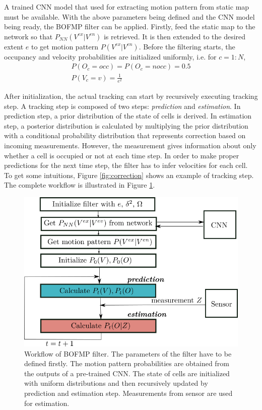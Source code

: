 A trained CNN model that used for extracting motion pattern from static map must be available. With the above parameters being defined and the CNN model being ready, the BOFMP filter can be applied. Firstly, feed the static map to the network so that $P_{NN}(V^{ex}|V^{en})$ is retrieved. It is then extended to the desired extent $e$ to get motion pattern $P(V^{ex}|V^{en})$. Before the filtering starts, the occupancy and velocity probabilities are initialized uniformly, i.e. for $c=1:N$,
\begin{gather}
P(O_c = occ) = P(O_c = nocc)=0.5 \label{eq:init_O}\\ 
P(V_c=v) = \frac{1}{e^2} \label{eq:init_V}
\end{gather}

 After initialization, the actual tracking can start by recursively executing tracking step. A tracking step is composed of two steps: \textit{prediction} and \textit{estimation}. In prediction step, a prior distribution of the state of cells is derived. In estimation step, a posterior distribution is calculated by multiplying the prior distribution with a conditional probability distribution that represents correction based on incoming measurements. However, the measurement gives information about only whether a cell is occupied or not at each time step. In order to make proper predictions for the next time step, the filter has to infer velocities for each cell. To get some intuitions, Figure \ref{fig:correction} shows an example of tracking step. The complete workflow is illustrated in Figure \ref{fig:fitering_workflow}.

\begin{figure}[H]
  \centering
    \includegraphics[width=.7\textwidth]{figures/filtering_workflow.png}
    \caption[Workflow of BOFMP filter.]{Workflow of BOFMP filter. The parameters of the filter have to be defined firstly. The motion pattern probabilities are obtained from the outputs of a pre-trained CNN. The state of cells are initialized with uniform distributions and then recursively updated by prediction and estimation step. Measurements from sensor are used for estimation.}
    \label{fig:fitering_workflow}
\end{figure}

